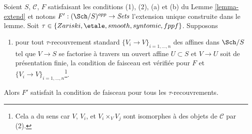 \begin{lemma}
\label{lemma-extend-sheaf-general}
Soient $S$, $\mathcal{C}$, $F$ satisfaisant les conditions (1), (2), (a) et (b) du Lemme \ref{lemma-extend} et notons $F' : (\Sch/S)^{opp} \to \textit{Sets}$ l'extension unique construite dans le lemme. Soit $\tau \in \{Zariski, \etale, smooth, syntomic, fppf\}$. Supposons
\begin{enumerate}
\item[(c)] pour tout $\tau$-recouvrement standard $\{V_i \to V\}_{i = 1, \ldots, n}$ des affines dans $\Sch/S$ tel que $V \to S$ se factorise à travers un ouvert affine $U \subset S$ et $V \to U$ soit de présentation finie, la condition de faisceau est vérifiée pour $F$ et $\{V_i \to V\}_{i = 1, \ldots, n}$\footnote{Cela a du sens car $V$, $V_i$, et $V_i \times_V V_j$ sont isomorphes à des objets de $\mathcal{C}$ par (2).}.
\end{enumerate}
Alors $F'$ satisfait la condition de faisceau pour tous les $\tau$-recouvrements.
\end{lemma}

